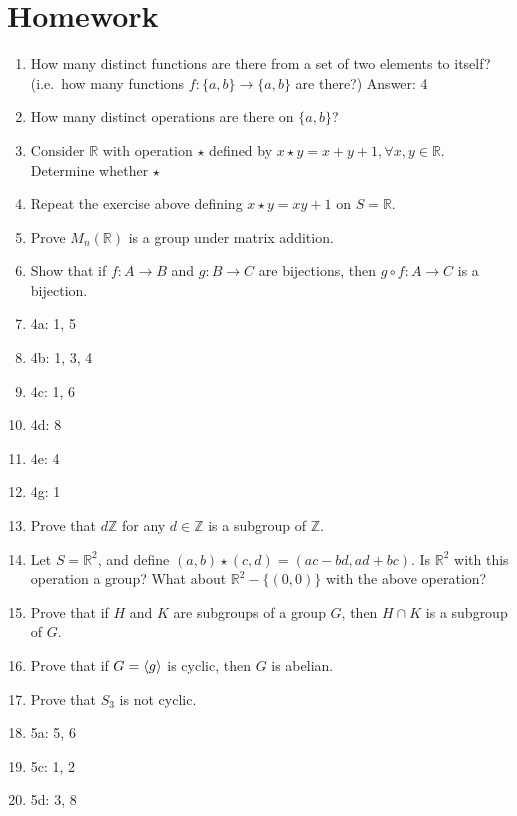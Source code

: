 \documentclass[12pt,letterpaper,DIV=11,final]{scrartcl}
\theoremstyle{plain}
\theoremstyle{definition}
\theoremstyle{remark}
\begin{document}
\part*{Homework}
\begin{enumerate}
  \item How many distinct functions are there from a set of two elements to itself? (i.e.\ how many functions $f: \{a, b\} \to \{a, b\}$ are there?) Answer: 4
  \item How many distinct operations are there on $\{a, b\}$?
  \item Consider $\mathbb{R}$ with operation $\star$ defined by $x \star y = x + y + 1, \forall x, y \in \mathbb{R}$.
    Determine whether $\star$ 
  \item Repeat the exercise above defining $x \star y = xy + 1$ on $S = \mathbb{R}$.
  \item Prove $M_n(\mathbb{R})$ is a group under matrix addition.
  \item Show that if $f: A \to B$ and $g: B \to C$ are bijections, then $g \circ f: A \to C$ is a bijection.

  \item 4a: 1, 5
  \item 4b: 1, 3, 4
  \item 4c: 1, 6
  \item 4d: 8
  \item 4e: 4
  \item 4g: 1
  \item Prove that $d \mathbb{Z}$ for any $d \in \mathbb{Z}$ is a subgroup of $\mathbb{Z}$.

  \item Let $S = \mathbb{R}^2$, and define $(a, b) \star (c, d) = (ac - bd, ad + bc)$.
    Is $\mathbb{R}^2$ with this operation a group?
    What about $\mathbb{R}^2 - \{ (0, 0) \}$ with the above operation?
  \item Prove that if $H$ and $K$ are subgroups of a group $G$, then $H \cap K$ is a subgroup of $G$.
  \item Prove that if $G = \braket{g}$ is cyclic, then $G$ is abelian.
  \item Prove that $S_3$ is not cyclic.
  \item 5a: 5, 6
  \item 5c: 1, 2
  \item 5d: 3, 8


\end{enumerate}
\end{document}

